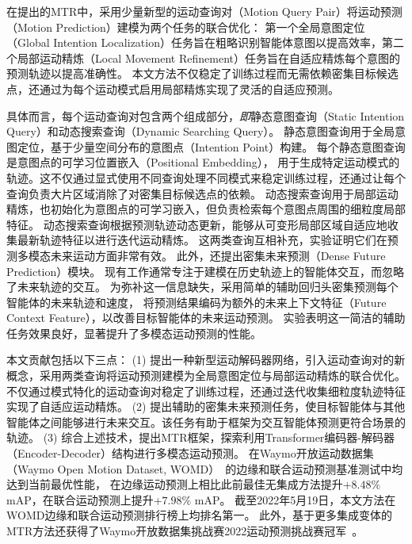 \documentclass{article}
\begin{document}
   
    在提出的MTR中，采用少量新型的运动查询对（Motion Query Pair）将运动预测（Motion Prediction）建模为两个任务的联合优化：
		第一个全局意图定位（Global Intention Localization）任务旨在粗略识别智能体意图以提高效率，第二个局部运动精炼（Local Movement Refinement）任务旨在自适应精炼每个意图的预测轨迹以提高准确性。
	本文方法不仅稳定了训练过程而无需依赖密集目标候选点，还通过为每个运动模式启用局部精炼实现了灵活的自适应预测。
	
	具体而言，每个运动查询对包含两个组成部分，\emph{即}静态意图查询（Static Intention Query）和动态搜索查询（Dynamic Searching Query）。
    静态意图查询用于全局意图定位，基于少量空间分布的意图点（Intention Point）构建。
    每个静态意图查询是意图点的可学习位置嵌入（Positional Embedding），
    用于生成特定运动模式的轨迹。这不仅通过显式使用不同查询处理不同模式来稳定训练过程，还通过让每个查询负责大片区域消除了对密集目标候选点的依赖。
	动态搜索查询用于局部运动精炼，也初始化为意图点的可学习嵌入，但负责检索每个意图点周围的细粒度局部特征。
		动态搜索查询根据预测轨迹动态更新，能够从可变形局部区域自适应地收集最新轨迹特征以进行迭代运动精炼。
	这两类查询互相补充，实验证明它们在预测多模态未来运动方面非常有效。
	此外，还提出密集未来预测（Dense Future Prediction）模块。
	现有工作通常专注于建模在历史轨迹上的智能体交互，而忽略了未来轨迹的交互。
	为弥补这一信息缺失，采用简单的辅助回归头密集预测每个智能体的未来轨迹和速度，
    将预测结果编码为额外的未来上下文特征（Future Context Feature），以改善目标智能体的未来运动预测。
	实验表明这一简洁的辅助任务效果良好，显著提升了多模态运动预测的性能。
	
	本文贡献包括以下三点：
	(1) 提出一种新型运动解码器网络，引入运动查询对的新概念，采用两类查询将运动预测建模为全局意图定位与局部运动精炼的联合优化。
	不仅通过模式特化的运动查询对稳定了训练过程，还通过迭代收集细粒度轨迹特征实现了自适应运动精炼。
	(2) 提出辅助的密集未来预测任务，使目标智能体与其他智能体之间能够进行未来交互。该任务有助于框架为交互智能体预测更符合场景的轨迹。
	(3) 综合上述技术，提出MTR框架，探索利用Transformer编码器-解码器（Encoder-Decoder）结构进行多模态运动预测。%
       在Waymo开放运动数据集（Waymo Open Motion Dataset, WOMD）~\cite{ettinger2021large}的边缘和联合运动预测基准测试中均达到当前最优性能，
	在边缘运动预测上相比此前最佳无集成方法提升+$8.48\%$ mAP，在联合运动预测上提升+$7.98\%$ mAP。
	截至2022年5月19日，本文方法在WOMD边缘和联合运动预测排行榜上均排名第一。
	此外，基于更多集成变体的MTR方法还获得了Waymo开放数据集挑战赛2022运动预测挑战赛冠军~\cite{womd_leaderboard2022,shi2022mtr}。
	
\end{document}
